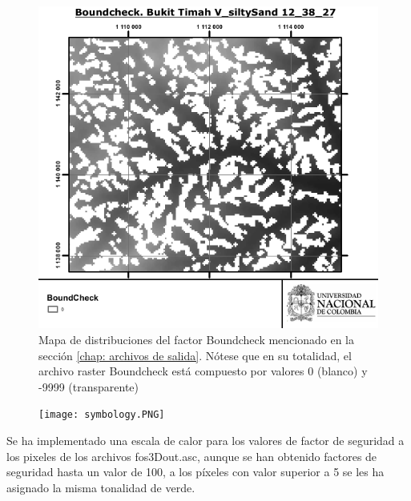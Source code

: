 \begin{figure}[H]
\centering
\includegraphics[scale=1]{img/boundcheck.pdf}
\caption{Mapa de distribuciones del factor Boundcheck mencionado en la secci\'on \ref{chap: archivos de salida}.
N\'otese que en su totalidad, el archivo raster Boundcheck est\'a compuesto por valores 0 (blanco) y -9999 (transparente) }
\label{fig:boundcheck}
\end{figure}




\begin{figure} %
    \centering
    \texttt{[image: symbology.PNG]}
\end{figure}


Se ha implementado una escala de calor para los valores de factor de seguridad a los
pixeles de los archivos fos3D\textunderscore out.asc, aunque se han obtenido factores de seguridad hasta
un valor de 100, a los p\'ixeles con valor superior a 5 se les ha asignado la misma tonalidad
de verde.
\\

